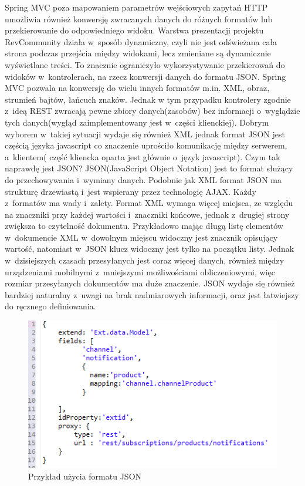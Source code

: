 Spring MVC poza mapowaniem parametrów wejściowych zapytań HTTP umożliwia również konwersję zwracanych danych do różnych formatów lub przekierowanie do odpowiedniego widoku. Warstwa prezentacji projektu RevCommunity działa w~sposób dynamiczny, czyli nie jest odświeżana cała strona podczas przejścia między widokami, lecz zmieniane są dynamicznie wyświetlane treści. To znacznie ograniczyło wykorzystywanie przekierowań do widoków w~kontrolerach, na rzecz konwersji danych do formatu JSON. Spring MVC pozwala na konwersję do wielu innych formatów m.in. XML, obraz, strumień bajtów, łańcuch znaków. Jednak w tym przypadku kontrolery zgodnie z~ideą REST zwracają pewne zbiory danych(zasobów) bez informacji o~wyglądzie tych danych(wygląd zaimplementowany jest w~części klienckiej). Dobrym wyborem w~takiej sytuacji wydaje się również XML jednak format JSON jest częścią języka javascript co znaczenie uprościło komunikację między serwerem, a~klientem( część kliencka oparta jest głównie o~język javascript).
Czym tak naprawdę jest JSON? JSON(JavaScript Object Notation) jest to format służący do przechowywania i~wymiany danych. Podobnie jak XML format JSON ma strukturę drzewiastą i~jest wspierany przez technologię AJAX. Każdy z~formatów ma wady i~zalety. Format XML wymaga więcej miejsca, ze względu na znaczniki przy każdej wartości i~znaczniki końcowe, jednak z~drugiej strony zwiększa to czytelność dokumentu. Przykładowo mając długą listę elementów w~dokumencie XML w~dowolnym miejscu widoczny jest znacznik opisujący wartość, natomiast w~JSON klucz widoczny jest tylko na początku listy. Jednak w~dzisiejszych czasach przesyłanych jest coraz więcej danych, również między urządzeniami mobilnymi z~mniejszymi możliwościami obliczeniowymi, więc rozmiar przesyłanych dokumentów ma duże znaczenie. JSON wydaje się również bardziej naturalny z~uwagi na brak nadmiarowych informacji, oraz jest łatwiejszy do ręcznego definiowania. 

\begin{figure}[H]
	\centering
	\includegraphics{images/json.png}
	\caption{Przykład użycia formatu JSON}
\end{figure}


